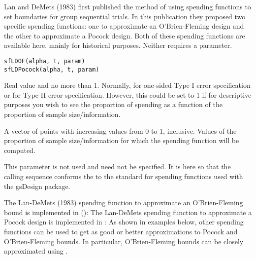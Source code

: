 \begin{Description}\relax
Lan and DeMets (1983) first published the method of using spending functions to set boundaries for group sequential trials.
In this publication they proposed two specific spending functions:
one to approximate an O'Brien-Fleming design and the other to approximate a Pocock design.
Both of these spending functions are available here, mainly for historical purposes.
Neither requires a parameter.
\end{Description}
\begin{Usage}
\begin{verbatim}
sfLDOF(alpha, t, param)
sfLDPocock(alpha, t, param)
\end{verbatim}
\end{Usage}
\begin{Arguments}
\begin{ldescription}
\item[\code{alpha}] Real value  and no more than 1. Normally, 
 for one-sided Type I error specification
or  for Type II error specification. However, this could be set to 1 if for descriptive purposes
you wish to see the proportion of spending as a function of the proportion of sample size/information.
\item[\code{t}] A vector of points with increasing values from 0 to 1, inclusive. Values of the proportion of 
sample size/information for which the spending function will be computed.
\item[\code{param}] This parameter is not used and need not be specified. It is here so that the calling sequence conforms 
the to the standard for spending functions used with the gsDesign package.
\end{ldescription}
\end{Arguments}
\begin{Details}\relax
The Lan-DeMets (1983) spending function to approximate an
O'Brien-Fleming bound is implemented in ():
The Lan-DeMets spending function to approximate a Pocock design is implemented in {}:
As shown in examples below, other spending functions can be used to get as good or better approximations to Pocock and
O'Brien-Fleming bounds. In particular, O'Brien-Fleming bounds can be closely approximated using .
\end{Details}
